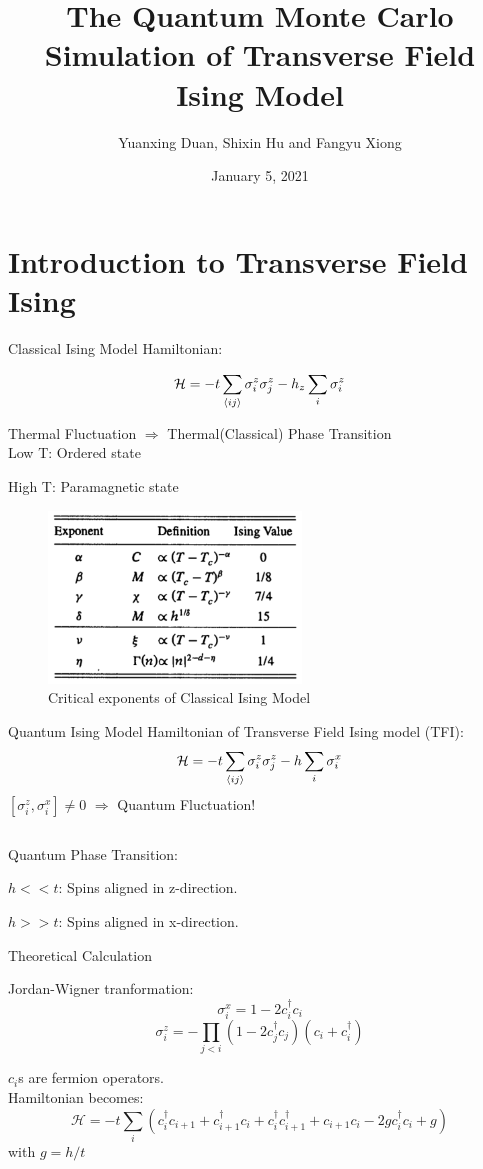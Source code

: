 \documentclass[aspectratio=43]{beamer}
\title{The Quantum Monte Carlo Simulation of Transverse Field Ising Model}
\author{Yuanxing Duan, Shixin Hu and Fangyu Xiong}
\institute{School of Physics, Peking University}
\date{January 5, 2021}
\begin{document}
\maketitle

\section{Introduction to Transverse Field Ising}
\begin{frame}{Classical Ising Model}
Hamiltonian:

\[
\mathcal{H}=-t\sum_{\braket{ij}}\sigma_i^z\sigma_j^z-h_z\sum_{i}\sigma_i^z
\]

Thermal Fluctuation $\Longrightarrow$ Thermal(Classical) Phase Transition
\[
\]
Low T: Ordered state

High T: Paramagnetic state
\end{frame}

\begin{frame}
\begin{figure}[htpb]
	\centering
	\includegraphics[width=0.6\textwidth]{../Figures/Critical_Exponents.png}
	\caption{Critical exponents of Classical Ising Model}
	\label{fig:Critical Exponents}
\end{figure}
\end{frame}

\begin{frame}{Quantum Ising Model}
Hamiltonian of Transverse Field Ising model (TFI):
\[
\mathcal{H}=-t\sum_{\braket{ij}}\sigma_i^z\sigma_j^z-h\sum_{i}\sigma_i^x
\]
$[\sigma_i^z,\sigma_i^x]\ne0$ $\Longrightarrow$ Quantum Fluctuation!

\[
\]

Quantum Phase Transition:

$h<<t$: Spins aligned in z-direction.

$h>>t$: Spins aligned in x-direction.
\end{frame}

\begin{frame}{Theoretical Calculation}

Jordan-Wigner tranformation:
\[
\sigma_i^x =1-2c^{\dagger}_ic_i
\]
\[
\sigma_i^z =-\prod_{j<i}(1-2c^{\dagger}_jc_j)(c_i+c_i^{\dagger})
\]

$c_i$s are fermion operators.
\[
\]
Hamiltonian becomes:
\[
\mathcal{H}=-t\sum_{i}(c^{\dagger}_ic_{i+1}+c^{\dagger}_{i+1}c_i+c^{\dagger}_ic^{\dagger}_{i+1}+c_{i+1}c_i-2gc^{\dagger}_ic_i+g)
\]
with $g=h/t$
\end{frame}
\end{document}
